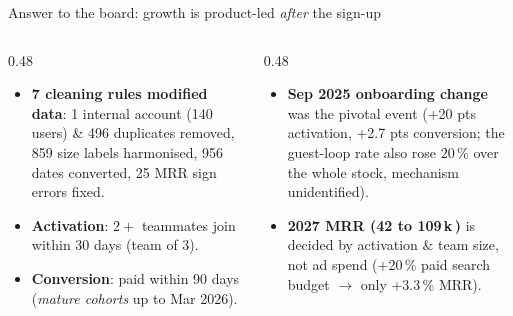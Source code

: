 \documentclass[aspectratio=169,10pt]{beamer}
\newcommand{\eur}{\,\texteuro}
\newcommand{\pc}{\,\%}
\begin{document}
\begin{frame}{Answer to the board: growth is product-led \emph{after} the sign-up}
  \vspace{4pt}
  \begin{columns}[T]
    \begin{column}{0.48\textwidth}
      \begin{tcolorbox}[colback=white,colframe=navy!40,boxrule=0.5pt,arc=2pt,left=6pt,right=6pt,top=4pt,bottom=4pt,title={\footnotesize\bfseries\color{navy} Data cleaning \& definitions}]
        \scriptsize
        \begin{itemize}\setlength{\itemsep}{2pt}
          \item \textbf{7 cleaning rules modified data}: 1 internal account (140 users) \& 496 duplicates removed, 859 size labels harmonised, 956 dates converted, 25 MRR sign errors fixed.
          \item \textbf{Activation}: $2+$ teammates join within 30 days (team of 3).
          \item \textbf{Conversion}: paid within 90 days (\emph{mature cohorts} up to Mar 2026).
        \end{itemize}
      \end{tcolorbox}
    \end{column}
    \begin{column}{0.48\textwidth}
      \begin{tcolorbox}[colback=white,colframe=navy!40,boxrule=0.5pt,arc=2pt,left=6pt,right=6pt,top=4pt,bottom=4pt,title={\footnotesize\bfseries\color{navy}Strategic diagnosis before Series A}]
        \scriptsize
        \begin{itemize}\setlength{\itemsep}{2pt}
          \item \textbf{Sep 2025 onboarding change} was the pivotal event (+20 pts activation, +2.7 pts conversion; the guest-loop rate also rose $20\pc{}$ over the whole stock, mechanism unidentified).
          \item \textbf{2027 MRR (42 to 109\,k\eur{})} is decided by activation \& team size, not ad spend (+20\pc{} paid search budget $\rightarrow$ only +3.3\pc{} MRR).
        \end{itemize}
      \end{tcolorbox}
    \end{column}
  \end{columns}
\end{frame}
\end{document}
